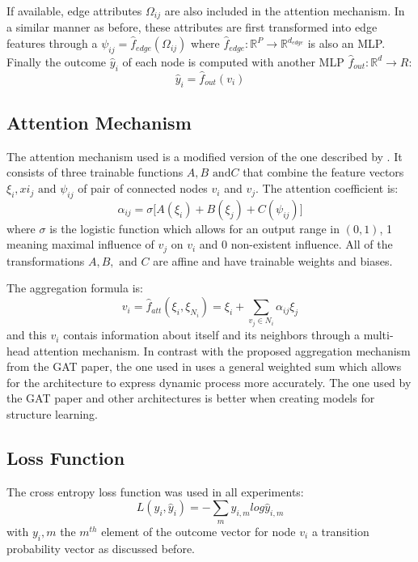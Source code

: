 If available, edge attributes $\Omega_{ij}$ are also included in the attention
mechanism. In a similar manner as before, these attributes are first transformed
into edge features through a $\psi_{ij} = \hat{f}_{edge} (\Omega_{ij})$ where
$\hat{f}_{edge}: \mathbb{R}^P \rightarrow \mathbb{R}^{d_{edge}}$ is also an MLP.
Finally the outcome $\hat{y}_i$ of each node is computed with another MLP $\hat{f}_{out}: \mathbb{R}^d \rightarrow R$:
\begin{equation}
  \label{eq:final_out}
  \hat{y}_i = \hat{f}_{out}(v_i)
\end{equation}

\subsection{Attention Mechanism}
The attention mechanism used is a modified version of the one described by
\citet{velickovic2017graph}. It consists of three trainable functions
$A, B \text{ and} C$ that combine the feature vectors $\xi_i, xi_j \text{ and } \psi_{ij}$ of
pair of connected nodes $v_i$ and $v_j$. The attention coefficient is:
\begin{equation}
  \label{eq:att_coeff}
  \alpha_{ij} = \sigma \big[ A(\xi_i) + B(\xi_j) + C(\psi_{ij}) \big]
\end{equation}
where $\sigma$ is the logistic function which allows for an output range
in $(0, 1)$, 1 meaning maximal influence of $v_j$ on $v_i$ and 0 non-existent influence.
All of the transformations $A, B, \text{ and } C$ are affine and have trainable weights
and biases. 

The aggregation formula is:
\begin{equation}
  \label{eq:att_aggr}
  v_i = \hat{f}_{att}(\xi_i, \xi_{N_i}) = \xi_i + \sum_{v_j \in N_i} \alpha_{ij} \xi_j
\end{equation}
and this $v_i$ contais information about itself and its neighbors through a
multi-head attention mechanism. In contrast with the proposed aggregation mechanism
from the GAT paper, the one used in  uses a general weighted sum
which allows for the architecture to express dynamic process more accurately. The one
used by the GAT paper and other architectures is better when creating models for structure
learning. 

\subsection{Loss Function}
The cross entropy loss function was used in all experiments:
\begin{equation}
  \label{eq:cross_loss}
  L(y_i, \hat{y}_i) = - \sum_m y_{i,m} log \hat{y}_{i,m}
\end{equation}
with $y_i,m$ the $m^{th}$ element of the outcome vector for node $v_i$ a transition
probability vector as discussed before. 

